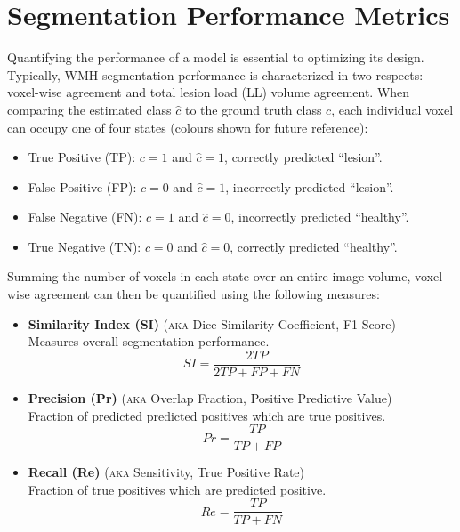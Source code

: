 \section{Segmentation Performance Metrics}\label{ss:exp-metrics}
Quantifying the performance of a model is essential to optimizing its design.
Typically, WMH segmentation performance is characterized in two respects:
voxel-wise agreement and total lesion load (LL) volume agreement.
When comparing the estimated class $\hat{c}$ to the ground truth class $c$,
each individual voxel can occupy one of four states (colours shown for future reference):
\begin{itemize}[itemsep=0pt,topsep=0pt]
  \item[\textcolor{green}{\scalebox{0.7}{$\blacksquare$}}]
  True Positive (TP):
  $c = 1$ and $\hat{c} = 1$,
  correctly predicted ``lesion''.
  \item[\textcolor{red}  {\scalebox{0.7}{$\blacksquare$}}]
  False Positive (FP):
  $c = 0$ and $\hat{c} = 1$,
  incorrectly predicted ``lesion''.
  \item[\textcolor{blue} {\scalebox{0.7}{$\blacksquare$}}]
  False Negative (FN):
  $c = 1$ and $\hat{c} = 0$,
  incorrectly predicted ``healthy''.
  \item[\textcolor{black}{\scalebox{0.7}{$\blacksquare$}}]
  True Negative (TN):
  $c = 0$ and $\hat{c} = 0$,
  correctly predicted ``healthy''.
\end{itemize}
Summing the number of voxels in each state over an entire image volume,
voxel-wise agreement can then be quantified using the following measures:
\begin{itemize}
  \item \textbf{Similarity Index (SI)}
  (\textsc{aka} Dice Similarity Coefficient, F1-Score)\\
  Measures overall segmentation performance.
  \begin{equation}
  SI = \dfrac{2TP}{2TP + FP + FN}%
  \label{eq:si}
  \end{equation}
  \item \textbf{Precision (Pr)}
  (\textsc{aka} Overlap Fraction, Positive Predictive Value)\\
  Fraction of predicted predicted positives which are true positives.
  \begin{equation}
  Pr = \dfrac{TP}{TP+FP}%
  \label{eq:pr}
  \end{equation}
  \item \textbf{Recall (Re)}
  (\textsc{aka} Sensitivity, True Positive Rate)\\
  Fraction of true positives which are predicted positive.
  \begin{equation}
  Re = \dfrac{TP}{TP+FN}%
  \label{eq:re}
  \end{equation}
\end{itemize}
